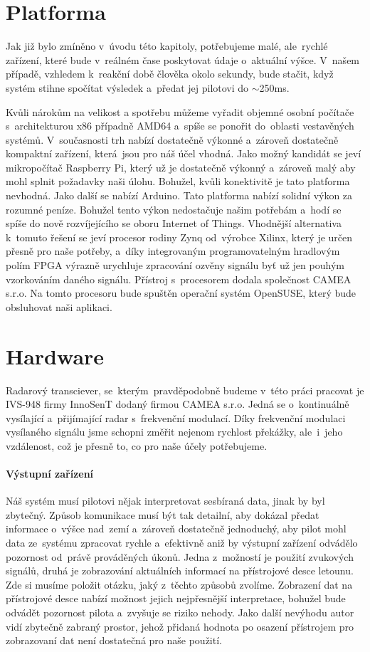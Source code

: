 	\section{Platforma}\label{navrhReseni::platforma}
		Jak již bylo zmíněno v~úvodu této kapitoly, potřebujeme malé, ale~rychlé zařízení, které bude v~reálném čase poskytovat údaje o~aktuální výšce. V~našem případě, vzhledem k~reakční době člověka okolo sekundy, bude stačit, když systém stihne spočítat výsledek a~předat jej pilotovi do $\sim$250ms.\par
		
		Kvůli nárokům na velikost a spotřebu můžeme vyřadit objemné osobní počítače s~architekturou x86 případně AMD64 a~spíše se ponořit do~oblasti vestavěných systémů. V~současnosti trh nabízí dostatečně výkonné a~zároveň dostatečně kompaktní zařízení, která~jsou pro náš účel vhodná. Jako možný kandidát se jeví mikropočítač Raspberry Pi, který už je dostatečně výkonný a~zároveň malý aby mohl splnit požadavky naši úlohu. Bohužel, kvůli konektivitě je tato platforma nevhodná. Jako další se nabízí Arduino. Tato platforma nabízí solidní výkon za rozumné peníze. Bohužel tento výkon nedostačuje našim potřebám a~hodí se spíše do nově rozvíjejícího se oboru Internet of Things. Vhodnější alternativa k~tomuto řešení se jeví procesor rodiny Zynq od~výrobce Xilinx, který je určen přesně pro naše potřeby, a~díky integrovaným programovatelným hradlovým polím FPGA výrazně urychluje zpracování ozvěny signálu byť už jen pouhým vzorkováním daného signálu. Přístroj s~procesorem dodala společnost CAMEA s.r.o. Na tomto procesoru bude spuštěn operační systém OpenSUSE, který bude obsluhovat naši aplikaci.
		
	\section{Hardware}
		Radarový transciever, se~kterým~pravděpodobně budeme v~této práci pracovat je IVS-948 firmy InnoSenT dodaný firmou CAMEA s.r.o. Jedná se o~kontinuálně vysílající a~přijímající radar s~frekvenční modulací. Díky frekvenční modulaci vysílaného signálu jsme schopni změřit nejenom rychlost překážky, ale~i~jeho vzdálenost, což je přesně to, co pro naše účely potřebujeme.
	
	\paragraph{Výstupní zařízení}
		Náš systém musí pilotovi nějak interpretovat sesbíraná data, jinak by byl zbytečný. Způsob komunikace musí být tak detailní, aby dokázal předat informace o~výšce nad~zemí a~zároveň dostatečně jednoduchý, aby pilot mohl data ze~systému zpracovat rychle a~efektivně aniž by výstupní zařízení odvádělo pozornost od~právě prováděných úkonů. Jedna z~možností je použití zvukových signálů, druhá je zobrazování aktuálních informací na přístrojové desce letounu. Zde si musíme položit otázku, jaký z~těchto způsobů zvolíme. Zobrazení dat na přístrojové desce nabízí možnost jejich nejpřesnější interpretace, bohužel bude odvádět pozornost pilota a~zvyšuje se riziko nehody. Jako další nevýhodu autor vidí zbytečně zabraný prostor, jehož přidaná hodnota po osazení přístrojem pro zobrazovaní dat není dostatečná pro naše použití. 
			
